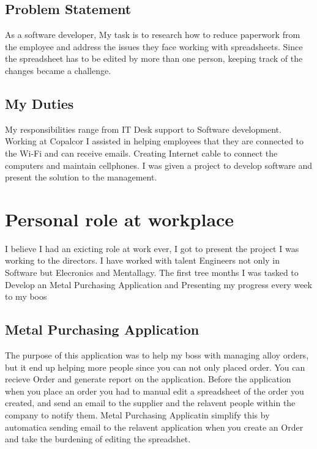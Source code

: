 \documentclass[paper=a4, fontsize=12pt]{scrartcl}
\numberwithin{equation}{section}		%
\numberwithin{figure}{section}			%
\numberwithin{table}{section}				%
\begin{document}
\subsection{Problem Statement}
As a software developer, My task is to research how to reduce paperwork from the employee and address the issues they face working with spreadsheets. Since the spreadsheet has to be edited by more than one person, keeping track of the changes became a challenge.

\subsection{My Duties}
My responsibilities range from IT Desk support to Software development. Working at Copalcor I assisted in helping employees that they are connected to the Wi-Fi and can receive emails. Creating Internet cable to connect the computers and maintain cellphones. I was given a project to develop software and present the solution to the management.

\section{\textbf{Personal role at workplace} }
I believe I had an exicting role at work ever, I got to present the project I was
working to the directors. I have worked with talent Engineers
not only in Software but Elecronics and Mentallagy. The first tree months I 
was tasked to Develop an Metal Purchasing Application and Presenting my progress
every week to my boos

\subsection{Metal Purchasing Application}
The purpose of this application was to help my boss with managing alloy orders, but
it end up helping more people since you can not only placed order. You can 
recieve Order and generate report on the application. Before the application
when you place an order you had to manual edit a spreadsheet of the order 
you created, and send an email to the supplier and the relavent people within
the company to notify them. Metal Purchasing Applicatin simplify this by 
automatica sending email to the relavent application when you create an Order and
take the burdening of editing the spreadshet.
\end{document}
